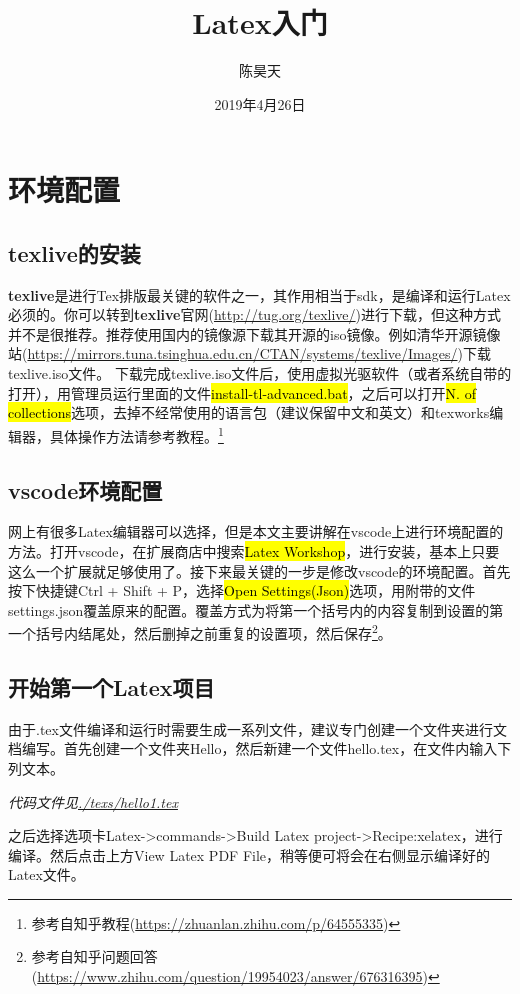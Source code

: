 \documentclass{article}
\title{Latex入门}
\author{陈昊天}
\date{2019年4月26日}
\begin{document}
    \maketitle
    \tableofcontents
    \section{环境配置}
        \subsection{texlive的安装}
            \textbf{texlive}是进行Tex排版最关键的软件之一，其作用相当于sdk，是编译和运行Latex必须的。你可以转到\textbf{texlive}官网(\url{http://tug.org/texlive/})进行下载，但这种方式并不是很推荐。推荐使用国内的镜像源下载其开源的iso镜像。例如清华开源镜像站(\url{https://mirrors.tuna.tsinghua.edu.cn/CTAN/systems/texlive/Images/})下载\textbf{}{texlive.iso}文件。
            下载完成texlive.iso文件后，使用虚拟光驱软件（或者系统自带的打开），用管理员运行里面的文件\hl{install-tl-advanced.bat}，之后可以打开\hl{N. of collections}选项，去掉不经常使用的语言包（建议保留中文和英文）和texworks编辑器，具体操作方法请参考教程。\footnote{参考自知乎教程(\url{https://zhuanlan.zhihu.com/p/64555335})}
        \subsection{vscode环境配置}
            网上有很多Latex编辑器可以选择，但是本文主要讲解在vscode上进行环境配置的方法。打开vscode，在扩展商店中搜索\hl{Latex Workshop}，进行安装，基本上只要这么一个扩展就足够使用了。接下来最关键的一步是修改vscode的环境配置。首先按下快捷键Ctrl + Shift + P，选择\hl{Open Settings(Json)}选项，用附带的文件settings.json覆盖原来的配置。覆盖方式为将第一个括号内的内容复制到设置的第一个括号内结尾处，然后删掉之前重复的设置项，然后保存\footnote{参考自知乎问题回答(\url{https://www.zhihu.com/question/19954023/answer/676316395})}。
        \subsection{开始第一个Latex项目}
            由于.tex文件编译和运行时需要生成一系列文件，建议专门创建一个文件夹进行文档编写。首先创建一个文件夹Hello，然后新建一个文件hello.tex，在文件内输入下列文本。
            
            \textit{代码文件见\url{./texs/hello1.tex}}

            之后选择选项卡Latex->commands->Build Latex project->Recipe:xelatex，进行编译。然后点击上方View Latex PDF File，稍等便可将会在右侧显示编译好的Latex文件。
\end{document}

